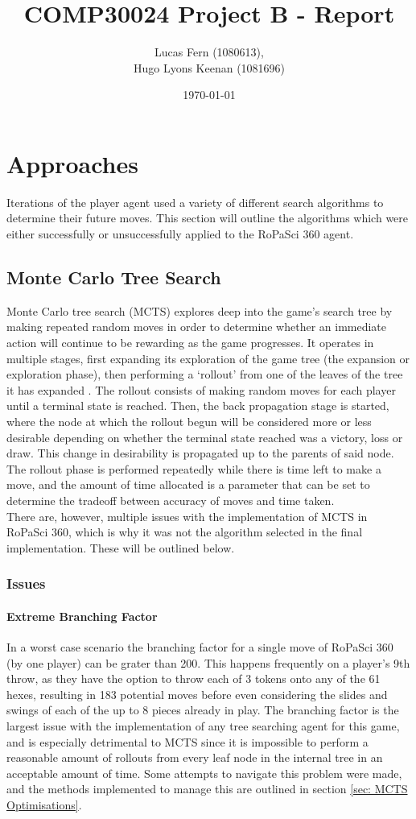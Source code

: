 \documentclass{article}
\title{COMP30024 Project B - Report}
\date{\today}
\author{Lucas Fern (1080613),\\Hugo Lyons Keenan (1081696)}
\begin{document}
\maketitle
\tableofcontents
\section{Approaches}
Iterations of the player agent used a variety of different search algorithms to determine their future moves. This section will outline the algorithms which were either successfully or unsuccessfully applied to the RoPaSci 360 agent.
\subsection{Monte Carlo Tree Search}
Monte Carlo tree search (MCTS) explores deep into the game's search tree by making repeated random moves in order to determine whether an immediate action will continue to be rewarding as the game progresses. It operates in multiple stages, first expanding its exploration of the game tree (the expansion or exploration phase), then performing a `rollout' from one of the leaves of the tree it has expanded \cite{YT-MCTS}. The rollout consists of making random moves for each player until a terminal state is reached. Then, the back propagation stage is started, where the node at which the rollout begun will be considered more or less desirable depending on whether the terminal state reached was a victory, loss or draw. This change in desirability is propagated up to the parents of said node. The rollout phase is performed repeatedly while there is time left to make a move, and the amount of time allocated is a parameter that can be set to determine the tradeoff between accuracy of moves and time taken.\\[2mm]
There are, however, multiple issues with the implementation of MCTS in RoPaSci 360, which is why it was not the algorithm selected in the final implementation. These will be outlined below.
\subsubsection{Issues}
\paragraph{Extreme Branching Factor}
In a worst case scenario the branching factor for a single move of RoPaSci 360 (by one player) can be grater than 200. This happens frequently on a player's 9th throw, as they have the option to throw each of 3 tokens onto any of the 61 hexes, resulting in 183 potential moves before even considering the slides and swings of each of the up to 8 pieces already in play. The branching factor is the largest issue with the implementation of any tree searching agent for this game, and is especially detrimental to MCTS since it is impossible to perform a reasonable amount of rollouts from every leaf node in the internal tree in an acceptable amount of time. Some attempts to navigate this problem were made, and the methods implemented to manage this are outlined in section \ref{sec: MCTS Optimisations}.
\end{document}
